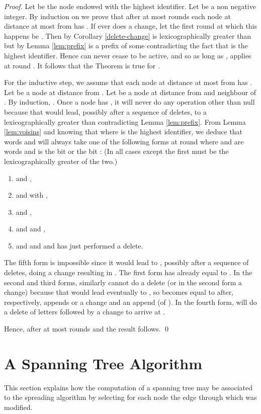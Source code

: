 \documentclass[11pt,envcountsame,letterpaper]{llncs}
\begin{document}
\begin{proof}
Let  be the node endowed with the highest identifier. 
Let  be a non negative integer.
By induction on  we prove that after at most  rounds
each node at distance at most  from 
has .
If  ever does a change, let the first round at which this happens be .
Then by Corollary \ref{delete-change}  is lexicographically greater
than  but by Lemma \ref{lem:prefix}  is a prefix of some
 contradicting the fact that  is the highest identifier.
Hence
 can never cease to be active,
and so
as long as ,
 applies  at round .
It follows that the Theorem is true for .

For the inductive step,
we assume that each node at distance at most  from 
has .
Let  be a node at distance  from . Let  be a node
at distance  from  and neighbour of .
By induction, .
Once a node  has , it will never do any operation other than null
because that would lead, possibly after a sequence of deletes, to a 
lexicographically greater than  contradicting Lemma \ref{lem:prefix}.
From Lemma \ref{lem:voisins} and knowing
that   where  is the highest identifier,
we deduce that  words  and 
will always take one of the following forms 
at round  where  and
 are words and  is the bit  or the bit :
(In all cases except the first  must be the lexicographically greater of the two.)
\begin{enumerate}
\item  and ,
\item   and  with ,
\item   and ,
\item   and  and ,
\item  and  and  and  has just performed
a delete.
\end{enumerate}
The fifth form is impossible since it would lead to , possibly after a sequence
of deletes, doing a change resulting in .
The first form has  already equal to .
In the second and third forms, similarly  cannot do a delete (or in the second form
a change) because that would lead
eventually to , so  becomes equal to  after,
respectively,  appends or a change and an append (of ).
In the fourth form,  will do a delete of  letters followed by a change to arrive at
.

Hence, after at most  rounds  and the
result follows.
\qed
\end{proof}

\section{A Spanning Tree Algorithm}
\label{sec:ST}
This section explains how the computation of a spanning tree may be associated 
to the spreading algorithm  by selecting for each node 
the edge through which  was modified.
\end{document}
